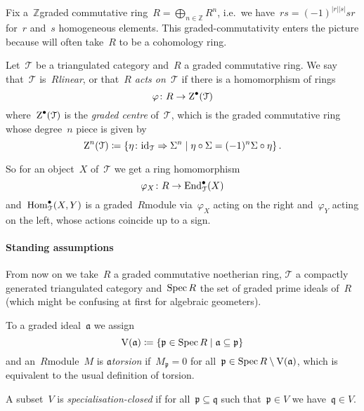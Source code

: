 \documentclass[10pt,a4paper]{article}
\begin{document}
Fix a~$\mathbb{Z}$\dash graded commutative ring~$R=\bigoplus_{n\in\mathbb{Z}}R^n$, i.e.\ we have~$rs=(-1)^{|r||s|}sr$ for~$r$ and~$s$ homogeneous elements. This graded-commutativity enters the picture because will often take~$R$ to be a cohomology ring.
\begin{definition}
  Let~$\mathcal{T}$ be a triangulated category and~$R$ a graded commutative ring. We say that~$\mathcal{T}$ is~\emph{$R$\dash linear}, or that~\emph{$R$ acts on~$\mathcal{T}$} if there is a homomorphism of rings
  \begin{equation}
    \varphi\colon R\to\operatorname{Z}^\bullet(\mathcal{T})
  \end{equation}
  where~$\operatorname{Z}^\bullet(\mathcal{T})$ is the \emph{graded centre} of~$\mathcal{T}$, which is the graded commutative ring whose degree~$n$ piece is given by
  \begin{equation}
    \operatorname{Z}^n(\mathcal{T})\coloneqq\left\{ \eta\colon\mathrm{id}_{\mathcal{T}}\Rightarrow\Sigma^n\mid\eta\circ\Sigma=(-1)^n\Sigma\circ\eta \right\}.
  \end{equation}
\end{definition}
So for an object~$X$ of~$\mathcal{T}$ we get a ring homomorphism
\begin{equation}
  \varphi_X\colon R\to\operatorname{End}_{\mathcal{T}}^\bullet(X)
\end{equation}
and~$\operatorname{Hom}_{\mathcal{T}}^\bullet(X,Y)$ is a graded~$R$\dash module via~$\varphi_X$ acting on the right and~$\varphi_Y$ acting on the left, whose actions coincide up to a sign.

\paragraph{Standing assumptions} From now on we take~$R$ a graded commutative noetherian ring, $\mathcal{T}$ a compactly generated triangulated category and~$\operatorname{Spec} R$ the set of graded prime ideals of~$R$ (which might be confusing at first for algebraic geometers).

To a graded ideal~$\mathfrak{a}$ we assign
\begin{equation}
  \operatorname{V}(\mathfrak{a})\coloneqq\left\{ \mathfrak{p}\in\operatorname{Spec} R\mid\mathfrak{a}\subseteq\mathfrak{p} \right\}
\end{equation}
and an~$R$\dash module~$M$ is \emph{$\mathfrak{a}$\dash torsion} if~$M_{\mathfrak{p}}=0$ for all~$\mathfrak{p}\in\operatorname{Spec} R\setminus\operatorname{V}(\mathfrak{a})$, which is equivalent to the usual definition of torsion.

A subset~$V$ is \emph{specialisation-closed} if for all~$\mathfrak{p}\subseteq\mathfrak{q}$ such that~$\mathfrak{p}\in V$ we have~$\mathfrak{q}\in V$.
\end{document}
